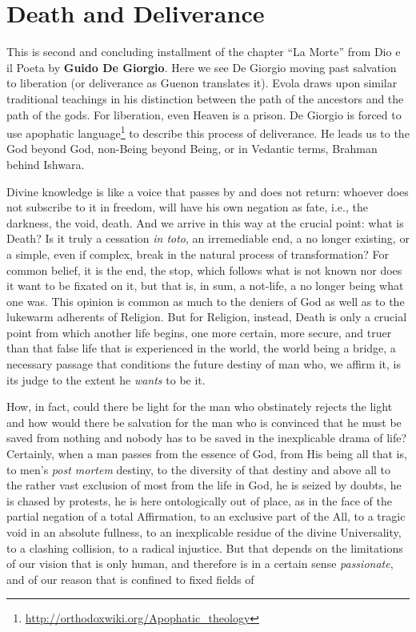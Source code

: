 \section{Death and Deliverance}

\begin{quotex}
This is second and concluding installment of the chapter ``La Morte'' from Dio e il Poeta by \textbf{Guido De Giorgio}. Here we see De Giorgio moving past salvation to liberation (or deliverance as Guenon translates it). Evola draws upon similar traditional teachings in his distinction between the path of the ancestors and the path of the gods. For liberation, even Heaven is a prison. De Giorgio is forced to use apophatic language\footnote{\url{http://orthodoxwiki.org/Apophatic_theology}} to describe this process of deliverance. He leads us to the God beyond God, non-Being beyond Being, or in Vedantic terms, Brahman behind Ishwara.
\end{quotex}


Divine knowledge is like a voice that passes by and does not return: whoever does not subscribe to it in freedom, will have his own negation as fate, i.e., the darkness, the void, death. And we arrive in this way at the crucial point: what is Death? Is it truly a cessation \emph{in toto}, an irremediable end, a no longer existing, or a simple, even if complex, break in the natural process of transformation? For common belief, it is the end, the stop, which follows what is not known nor does it want to be fixated on it, but that is, in sum, a not-life, a no longer being what one was. This opinion is common as much to the deniers of God as well as to the lukewarm adherents of Religion. But for Religion, instead, Death is only a crucial point from which another life begins, one more certain, more secure, and truer than that false life that is experienced in the world, the world being a bridge, a necessary passage that conditions the future destiny of man who, we affirm it, is its judge to the extent he \emph{wants} to be it.

How, in fact, could there be light for the man who obstinately rejects the light and how would there be salvation for the man who is convinced that he must be saved from nothing and nobody has to be saved in the inexplicable drama of life? Certainly, when a man passes from the essence of God, from His being all that is, to men's \emph{post mortem} destiny, to the diversity of that destiny and above all to the rather vast exclusion of most from the life in God, he is seized by doubts, he is chased by protests, he is here ontologically out of place, as in the face of the partial negation of a total Affirmation, to an exclusive part of the All, to a tragic void in an absolute fullness, to an inexplicable residue of the divine Universality, to a clashing collision, to a radical injustice. But that depends on the limitations of our vision that is only human, and therefore is in a certain sense
\emph{passionate}, and of our reason that is confined to fixed fields of

